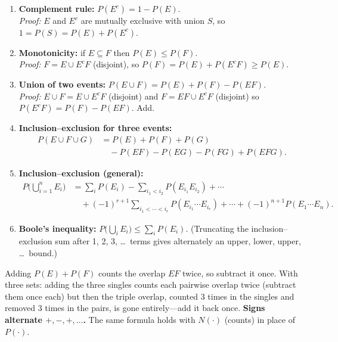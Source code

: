\documentclass[11pt]{article}
\begin{document}
\begin{thmbox}
\begin{enumerate}
\item \textbf{Complement rule:} $P(E^c)=1-P(E)$.\\
\emph{Proof:} $E$ and $E^c$ are mutually exclusive with union $S$, so $1=P(S)=P(E)+P(E^c)$.
\item \textbf{Monotonicity:} if $E\subseteq F$ then $P(E)\le P(F)$.\\
\emph{Proof:} $F=E\cup E^cF$ (disjoint), so $P(F)=P(E)+P(E^cF)\ge P(E)$.
\item \textbf{Union of two events:} $P(E\cup F)=P(E)+P(F)-P(EF)$.\\
\emph{Proof:} $E\cup F=E\cup E^cF$ (disjoint) and $F=EF\cup E^cF$ (disjoint) so $P(E^cF)=P(F)-P(EF)$. Add.
\item \textbf{Inclusion--exclusion for three events:}
\begin{align*}
P(E\cup F\cup G)&=P(E)+P(F)+P(G)\\
&\quad-P(EF)-P(EG)-P(FG)+P(EFG).
\end{align*}
\item \textbf{Inclusion--exclusion (general):}
\begin{align*}
P\Big(\bigcup_{i=1}^nE_i\Big)&=\sum_iP(E_i)-\sum_{i_1<i_2}P(E_{i_1}E_{i_2})+\cdots\\
&\quad+(-1)^{r+1}\!\!\sum_{i_1<\cdots<i_r}\!\!P(E_{i_1}\cdots E_{i_r})+\cdots+(-1)^{n+1}P(E_1\cdots E_n).
\end{align*}
\item \textbf{Boole's inequality:} $P\big(\bigcup_iE_i\big)\le\sum_iP(E_i)$. (Truncating the inclusion--exclusion sum after 1, 2, 3, \dots\ terms gives alternately an upper, lower, upper, \dots\ bound.)
\end{enumerate}
\end{thmbox}

\begin{ideabox}
Adding $P(E)+P(F)$ counts the overlap $EF$ twice, so subtract it once. With three sets: adding the three singles counts each pairwise overlap twice (subtract them once each) but then the triple overlap, counted 3 times in the singles and removed 3 times in the pairs, is gone entirely---add it back once. \textbf{Signs alternate $+,-,+,\dots$.} The same formula holds with $N(\cdot)$ (counts) in place of $P(\cdot)$.
\end{ideabox}
\end{document}
